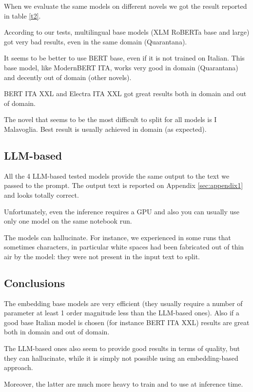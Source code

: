 \documentclass[11pt]{article}
\begin{document}
When we evaluate the same models on different novels we got the
result reported in table \ref{t2}.

According to our tests, multilingual base models (XLM RoBERTa base and large)
got very bad results, even in the same domain (Quarantana).

It seems to be better to use BERT base, even if it is not trained on Italian.
This base model, like ModernBERT ITA, works very good in domain (Quarantana) and
decently out of domain (other novels).

BERT ITA XXL and Electra ITA XXL got great results both in domain and out of domain.

The novel that seems to be the most difficult to split for all models is I Malavoglia.
Best result is usually achieved in domain (as expected).

\subsection{LLM-based}

All the 4 LLM-based tested models provide the same output to the text 
we passed to the prompt. The output text is reported on Appendix \ref{sec:appendix1}
and looks totally correct. 

Unfortunately, even the inference requires a GPU and also 
you can usually use only one model on the same notebook run.

The models can hallucinate. For instance, we experienced in some runs that 
sometimes characters, in particular white spaces had been fabricated 
out of thin air
by the model: they were not present in the input text to split.

\subsection{Conclusions}

The embedding base models are very efficient (they usually require a
number of parameter at least 1 order magnitude less than the LLM-based ones).
Also if a good base Italian model is chosen (for instance BERT ITA XXL)
results are great both in domain and out of domain.

The LLM-based ones also seem to provide good results in terms of quality, but they can hallucinate, while it is simply not possible using an embedding-based approach.

Moreover, the latter are much more heavy to train and to use at inference time.
\end{document}
